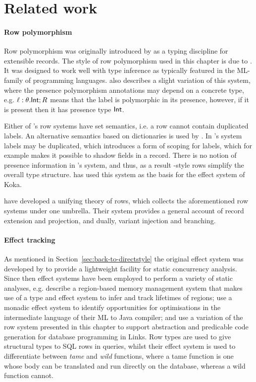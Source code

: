 \documentclass[12pt,phd,lfcs,twoside,openright,logo,leftchapter,normalheadings]{infthesis}
\theoremstyle{plain}
\theoremstyle{definition}
\begin{document}
\section{Related work}
\label{sec:related-work-calculi}

\paragraph{Row polymorphism} Row polymorphism was originally
introduced by \citet{Wand87} as a typing discipline for extensible
records. The style of row polymorphism used in this chapter is due to
\citet{Remy94}. It was designed to work well with type inference as
typically featured in the ML-family of programming
languages. \citeauthor{Remy94} also describes a slight variation of
this system, where the presence polymorphism annotations may depend on
a concrete type, e.g. $\ell : \theta.\mathsf{Int};R$ means that the label is
polymorphic in its presence, however, if it is present then it has
presence type $\mathsf{Int}$.

Either of \citeauthor{Remy94}'s row systems have set semantics, i.e. a
row cannot contain duplicated labels. An alternative semantics based
on dictionaries is used by \citet{Leijen05}. In
\citeauthor{Leijen05}'s system labels may be duplicated, which
introduces a form of scoping for labels, which for example makes it
possible to shadow fields in a record. There is no notion of presence
information in \cite{Leijen05}'s system, and thus, as a result
\citeauthor{Leijen05}-style rows simplify the overall type structure.
\citet{Leijen14} has used this system as the basis for the effect
system of Koka.

\citet{MorrisM19} have developed a unifying theory of rows, which
collects the aforementioned row systems under one umbrella. Their
system provides a general account of record extension and projection,
and dually, variant injection and branching.

\paragraph{Effect tracking} As mentioned in
Section~\ref{sec:back-to-directstyle} the original effect system was
developed by \citet{LucassenG88} to provide a lightweight facility for
static concurrency analysis. Since then effect systems have been
employed to perform a variety of static analyses,
e.g. \citet{TofteT94,TofteT97} describe a region-based memory
management system that makes use of a type and effect system to infer
and track lifetimes of regions; \citet{BentonK99} use a monadic effect
system to identify opportunities for optimisations in the intermediate
language of their ML to Java compiler;
%
and \citet{LindleyC12} use a variation of the row system presented in
this chapter to support abstraction and predicable code generation for
database programming in Links. Row types are used to give structural
types to SQL rows in queries, whilst their effect system is used to
differentiate between \emph{tame} and \emph{wild} functions, where a
tame function is one whose body can be translated and run directly on
the database, whereas a wild function cannot.
\end{document}
